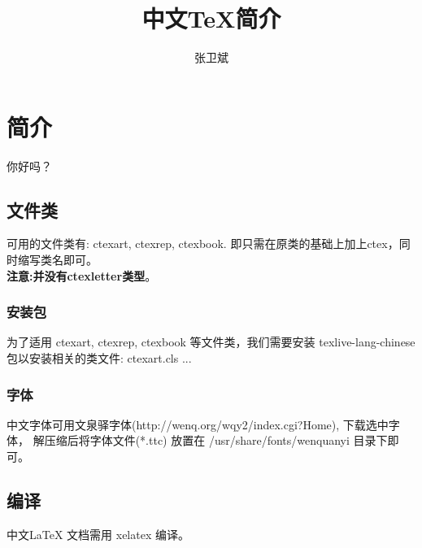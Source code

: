 \documentclass{ctexrep}
\title{中文\TeX{}简介}
\author{张卫斌}
\begin{document}
\maketitle
\tableofcontents
\chapter{简介}
你好吗？

\section{文件类}
可用的文件类有: ctexart, ctexrep, ctexbook.
即只需在原类的基础上加上ctex，同时缩写类名即可。    \\
\textbf{注意:并没有ctexletter类型}。

\subsection{安装包}
为了适用 ctexart, ctexrep, ctexbook 等文件类，我们需要安装 
{\color{red} texlive-lang-chinese} 包以安装相关的类文件: ctexart.cls ...

\subsection{字体}
中文字体可用文泉驿字体(http://wenq.org/wqy2/index.cgi?Home), 下载选中字体，
解压缩后将字体文件(*.ttc) 放置在 /usr/share/fonts/wenquanyi 目录下即可。

\section{编译}
中文\LaTeX{} 文档需用 xelatex 编译。


\end{document}
